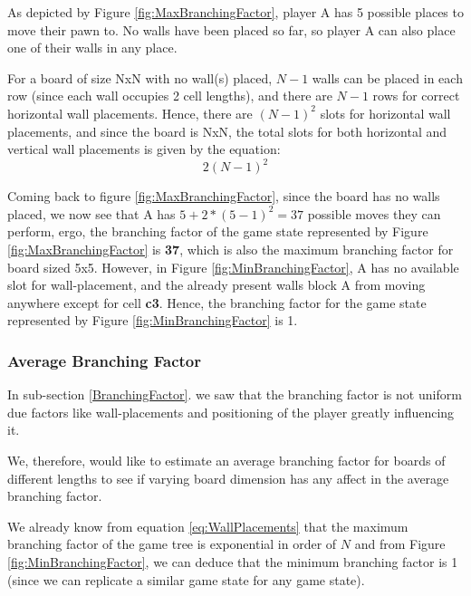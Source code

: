 As depicted by Figure \ref{fig:MaxBranchingFactor}, player A has 5 possible places to move their pawn to. No walls have been placed so far, so player A can also place one of their walls in any place.
\par
For a board of size NxN with no wall(s) placed, $N-1$ walls can be placed in each row (since each wall occupies 2 cell lengths), and there are $N-1$ rows for correct horizontal wall placements. Hence, there are $(N-1)^2$ slots for horizontal wall placements, and since the board is NxN, the total  slots for both horizontal and vertical wall placements is given by the equation:
\begin{equation}
\label{eq:WallPlacements}
    2(N-1)^2
\end{equation}

\par
Coming back to figure \ref{fig:MaxBranchingFactor}, since the board has no walls placed, we now see that A has $5 + 2*(5-1)^2 = 37$ possible moves they can perform, ergo, the branching factor of the game state represented by Figure \ref{fig:MaxBranchingFactor} is \textbf{37}, which is also the maximum branching factor for board sized 5x5.
\newline
\newline
However, in Figure \ref{fig:MinBranchingFactor}, A has no available slot for wall-placement, and the already present walls block A from moving anywhere except for cell \textbf{c3}. Hence, the branching factor for the game state represented by Figure \ref{fig:MinBranchingFactor} is 1.

\subsubsection{Average Branching Factor}

In sub-section \ref{BranchingFactor}. we saw that the branching factor is not uniform due factors like wall-placements and positioning of the player greatly influencing it.
\par
We, therefore, would like to estimate an average branching factor for boards of different lengths to see if varying board dimension has any affect in the average branching factor.
\par
We already know from equation \ref{eq:WallPlacements} that the maximum branching factor of the game tree is exponential in order of $N$ and from Figure \ref{fig:MinBranchingFactor}, we can deduce that the minimum branching factor is 1 (since we can replicate a similar game state for any game state).

